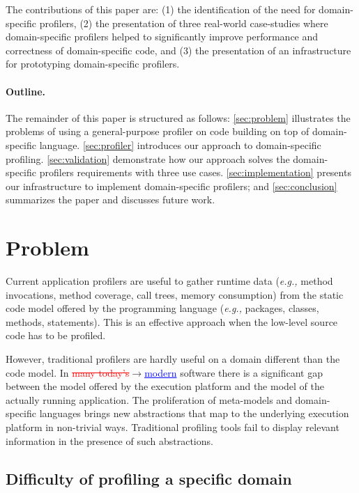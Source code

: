 \documentclass[runningheads]{llncs}
\newcommand{\ra}{$\rightarrow$}
\newcommand{\chg}[2]{\textcolor{red}{\sout{#1}}{\ra}\textcolor{blue}{\uline{#2}}} %
\newcommand{\eg}{\emph{e.g.,}\xspace}
\newcommand{\seclabel}[1]{\label{sec:#1}}
\begin{document}
The contributions of this paper are: (1) the identification of the need for domain-specific profilers, (2) the presentation of three real-world case-studies where domain-specific profilers helped to significantly improve performance and correctness of domain-specific code, and (3) the presentation of an infrastructure for prototyping domain-specific profilers.

\paragraph{Outline.} 
The remainder of this paper is structured as follows: \autoref{sec:problem} illustrates the problems of using a general-purpose profiler on code building on top of domain-specific language. \autoref{sec:profiler} introduces our approach to domain-specific profiling.
\autoref{sec:validation} demonstrate how our approach solves the domain-specific profilers requirements with three use cases. \autoref{sec:implementation} presents our infrastructure to implement domain-specific profilers; and \autoref{sec:conclusion} summarizes the paper and discusses future work.

\section{Problem}\seclabel{problem}

Current application profilers are useful to gather runtime data (\eg method invocations, method coverage, call trees, memory consumption) from the static code model offered by the programming language (\eg packages, classes, methods, statements). This is an effective approach when the low-level source code has to be profiled.

However, traditional profilers are hardly useful on a domain different than the code model. In \chg{many today's}{modern} software there is a significant gap between the model offered by the execution platform and the model of the actually running application. 
The proliferation of meta-models and domain-specific languages brings new abstractions that map to the underlying execution platform in non-trivial ways. Traditional profiling tools fail to display relevant information in the presence of such abstractions.


\subsection{Difficulty of profiling a specific domain} \label{mondrian}
\end{document}
